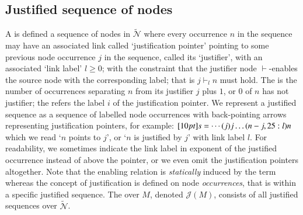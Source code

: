 \documentclass{elsarticle}
\theoremstyle{plain}
\theoremstyle{definition}
\newcommand\Nodes{\mathcal{N}}%
\newcommand\ExtendedNodes{\tilde{\Nodes}}
\newcommand{\enables}{\vdash} %
\def\justseqset{\mathcal{J}}
\begin{document}
\subsection{Justified sequence of nodes}
\label{sec:justseq}

A  is defined a sequence of nodes in $\ExtendedNodes$ where every occurrence $n$ in the sequence may have an associated link called `justification pointer' pointing to some previous node occurrence $j$ in the sequence, called its `justifier', with an associated `link label' $l\geq0$; with the constraint that the justifier node $\enables$-enables the source node with the corresponding label; that is $j \enables_l n$ must hold. The  is the number of occurrences separating $n$ from its justifier $j$ plus $1$, or $0$ of $n$ has not justifier; the  refers the label $i$ of the justification pointer.
%
We represent a justified sequence as a sequence of labelled node occurrences with back-pointing arrows representing justification pointers, for example: $\Pstr[10pt]{ s = \cdots (j){j} \ldots (n-j,25:l){n} }$ which we read `$n$ points to $j$', or `$n$ is justified by $j$' with link label $l$.
%
For readability, we sometimes indicate the link label in exponent of the justified occurrence instead of above the pointer, or we even omit the justification pointers altogether.
Note that the enabling relation is \emph{statically} induced by the term whereas the concept of justification is defined on node \emph{occurrences}, that is within a specific justified sequence. The  over $M$, denoted $\justseqset(M)$, consists of all justified sequences over $\ExtendedNodes$.
\end{document}
